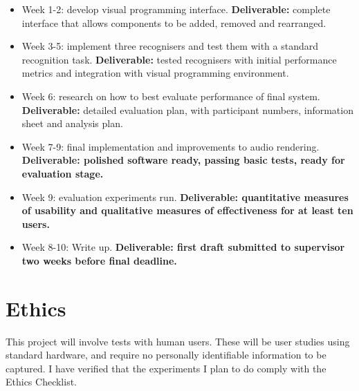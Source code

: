 \documentclass[11pt]{article}
\begin{document}
\begin{itemize}
    \tightlist
    \item
      Week 1-2: develop visual programming interface. \textbf{Deliverable:}
      complete interface that allows components to be added, removed and
      rearranged.
    \item
      Week 3-5: implement three recognisers and test them with a standard
      recognition task. \textbf{Deliverable:} tested recognisers with
      initial performance metrics and integration with visual programming
      environment.
    \item
      Week 6: research on how to best evaluate performance of final system.
      \textbf{Deliverable:} detailed evaluation plan, with participant
      numbers, information sheet and analysis plan.
    \item
      Week 7-9: final implementation and improvements to audio rendering.
      \textbf{Deliverable: polished software ready, passing basic tests,
      ready for evaluation stage.}
    \item
      Week 9: evaluation experiments run. \textbf{Deliverable: quantitative
      measures of usability and qualitative measures of effectiveness for at
      least ten users.}
    \item
      Week 8-10: Write up. \textbf{Deliverable: first draft submitted to
      supervisor two weeks before final deadline.}
    \end{itemize}
    

\section{Ethics}

This project will involve tests with human users.  These will be user studies
using standard hardware, and require no personally identifiable information to be captured.
I have verified that the experiments I plan to do comply with the Ethics Checklist.
\end{document}
